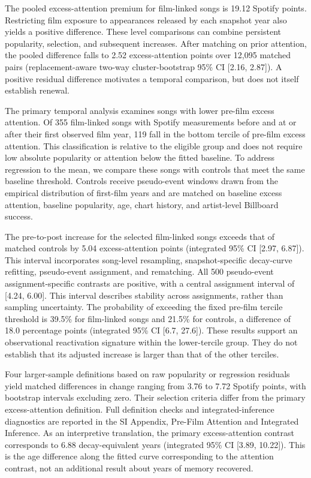\documentclass[10pt]{article}
\begin{document}
The pooled excess-attention premium for film-linked songs is 19.12 Spotify points. Restricting film exposure to appearances released by each snapshot year also yields a positive difference. These level comparisons can combine persistent popularity, selection, and subsequent increases. After matching on prior attention, the pooled difference falls to 2.52 excess-attention points over 12,095 matched pairs (replacement-aware two-way cluster-bootstrap 95\% CI [2.16, 2.87]). A positive residual difference motivates a temporal comparison, but does not itself establish renewal.

The primary temporal analysis examines songs with lower pre-film excess attention. Of 355 film-linked songs with Spotify measurements before and at or after their first observed film year, 119 fall in the bottom tercile of pre-film excess attention. This classification is relative to the eligible group and does not require low absolute popularity or attention below the fitted baseline. To address regression to the mean, we compare these songs with controls that meet the same baseline threshold. Controls receive pseudo-event windows drawn from the empirical distribution of first-film years and are matched on baseline excess attention, baseline popularity, age, chart history, and artist-level Billboard success.

The pre-to-post increase for the selected film-linked songs exceeds that of matched controls by 5.04 excess-attention points (integrated 95\% CI [2.97, 6.87]). This interval incorporates song-level resampling, snapshot-specific decay-curve refitting, pseudo-event assignment, and rematching. All 500 pseudo-event assignment-specific contrasts are positive, with a central assignment interval of [4.24, 6.00]. This interval describes stability across assignments, rather than sampling uncertainty. The probability of exceeding the fixed pre-film tercile threshold is 39.5\% for film-linked songs and 21.5\% for controls, a difference of 18.0 percentage points (integrated 95\% CI [6.7, 27.6]). These results support an observational reactivation signature within the lower-tercile group. They do not establish that its adjusted increase is larger than that of the other terciles.

Four larger-sample definitions based on raw popularity or regression residuals yield matched differences in change ranging from 3.76 to 7.72 Spotify points, with bootstrap intervals excluding zero. Their selection criteria differ from the primary excess-attention definition. Full definition checks and integrated-inference diagnostics are reported in the SI Appendix, Pre-Film Attention and Integrated Inference. As an interpretive translation, the primary excess-attention contrast corresponds to 6.88 decay-equivalent years (integrated 95\% CI [3.89, 10.22]). This is the age difference along the fitted curve corresponding to the attention contrast, not an additional result about years of memory recovered.
\end{document}

